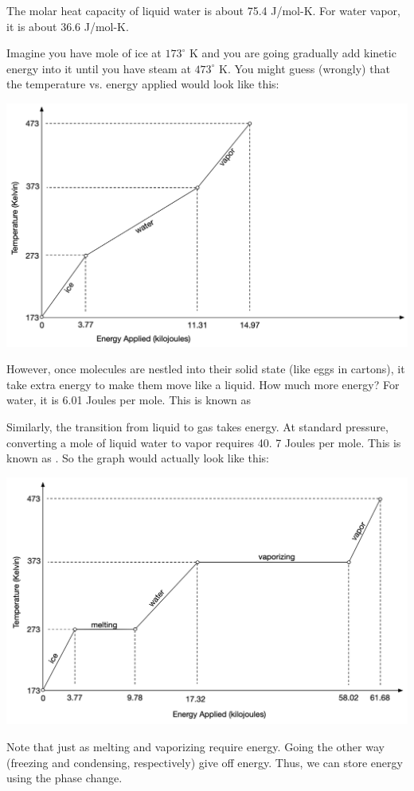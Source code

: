 The molar heat capacity of liquid water is about 75.4 J/mol-K.  For water vapor, it is about 36.6 J/mol-K.

Imagine you have mole of ice at $173^\circ$ K  and you are going gradually add kinetic energy into it until you have steam at $473^\circ$ K.  You might guess (wrongly) that the temperature vs. energy applied would look like this:

\includegraphics[width=0.8\linewidth]{energynaive.png}

However,  once molecules are nestled into their solid state (like eggs in cartons),  it take extra energy to make them move like a liquid.  How much more energy?  For water,  it is 6.01 Joules per mole.  This is known as 

Similarly,  the transition from liquid to gas takes energy.  At standard pressure,  converting a mole of liquid water to vapor requires 40. 7 Joules per mole.  This is known as . So the graph would actually look like this:

\includegraphics[width=0.8\linewidth]{energysoph.png}

Note that just as melting and vaporizing require energy.   Going the other way (freezing and condensing, respectively) give off energy.    Thus, we can store energy using the phase change.

